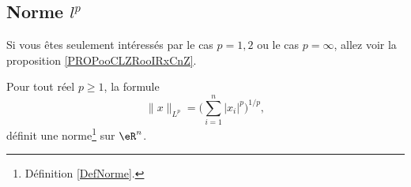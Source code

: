 \subsection{Norme \( l^p\)}

Si vous êtes seulement intéressés par le cas \( p=1,2\) ou le cas \( p=\infty\), allez voir la proposition \ref{PROPooCLZRooIRxCnZ}.
\begin{proposition}     \label{PROPooUDFTooQyhAtq}
	Pour tout réel \( p\geq 1\), la formule
	\begin{equation}        \label{EqDeformeLp}
		\| x \|_{L^p}=\Big( \sum_{i=1}^n| x_i |^p\Big)^{1/p},
	\end{equation}
	définit une norme\footnote{Définition \ref{DefNorme}.} sur \( \eR^n\).
\end{proposition}

